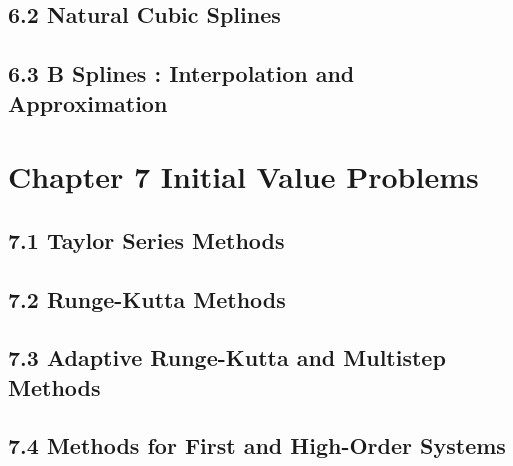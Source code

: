 \documentclass{article}
\theoremstyle{remark}
\begin{document}
\subsection{6.2 Natural Cubic Splines }


\subsection{6.3 B Splines : Interpolation and Approximation }


\section{Chapter 7 Initial Value Problems} 

\subsection{7.1 Taylor Series Methods}


\subsection{7.2 Runge-Kutta Methods}


\subsection{7.3 Adaptive Runge-Kutta and Multistep Methods}


\subsection{7.4 Methods for First and High-Order Systems }
\end{document}

